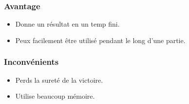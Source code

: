 \begin{frame}
  \frametitle{Avantage}
  \begin{itemize}
    \item<2-> Donne un résultat en un temp fini.
    \item<3-> Peux facilement être utilisé pendant le long d'une partie.
  \end{itemize}
\end{frame}

\begin{frame}
  \frametitle{Inconvénients}
  \begin{itemize}
    \item<2-> Perds la sureté de la victoire.
    \item<3-> Utilise beaucoup mémoire.
  \end{itemize}
\end{frame}
